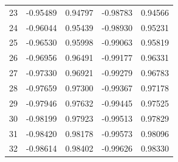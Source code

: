 \begin{itemize}
\begin{center}
\begin{tabular}{r|llll}
        23 & -0.95489 & 0.94797 & -0.98783 & 0.94566 \\
        24 & -0.96044 & 0.95439 & -0.98930 & 0.95231 \\
        25 & -0.96530 & 0.95998 & -0.99063 & 0.95819 \\
        26 & -0.96956 & 0.96491 & -0.99177 & 0.96331 \\
        27 & -0.97330 & 0.96921 & -0.99279 & 0.96783 \\
        28 & -0.97659 & 0.97300 & -0.99367 & 0.97178 \\
        29 & -0.97946 & 0.97632 & -0.99445 & 0.97525 \\
        30 & -0.98199 & 0.97923 & -0.99513 & 0.97829 \\
        31 & -0.98420 & 0.98178 & -0.99573 & 0.98096 \\
        32 & -0.98614 & 0.98402 & -0.99626 & 0.98330 \\
    \end{tabular}
    \end{center}


\end{itemize}

